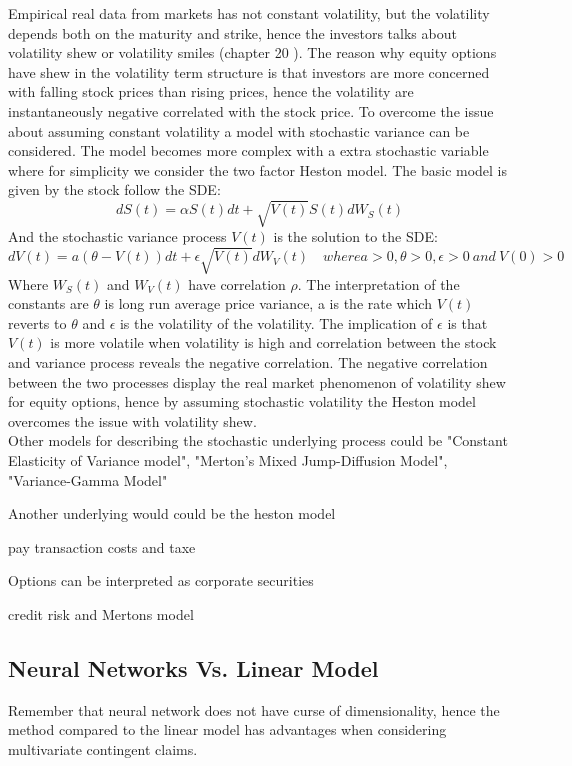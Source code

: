 Empirical real data from markets has not constant volatility, but the volatility depends both on the maturity and strike, hence the investors talks about volatility shew or volatility smiles (chapter 20 \parencite{Hull}). The reason why equity options have shew in the volatility term structure is that investors are more concerned with falling stock prices than rising prices, hence the volatility are instantaneously negative correlated with the stock price. To overcome the issue about assuming constant volatility a model with stochastic variance can be considered. The model becomes more complex with a extra stochastic variable where for simplicity we consider the two factor Heston model. The basic model is given by the stock follow the SDE:
$$dS(t)=\alpha S(t) dt + \sqrt{V(t)} S(t) dW_S(t)$$
And the stochastic variance process $V(t)$ is the solution to the SDE:
$$dV(t)=a(\theta - V(t))dt + \epsilon \sqrt{V(t)} dW_V(t) \quad where a>0,\theta>0, \epsilon>0 \ and \ V(0)>0$$
Where $W_S(t)$ and $W_V(t)$ have correlation $\rho$. The interpretation of the constants are $\theta$ is long run average price variance, a is the rate which $V(t)$ reverts to $\theta$ and $\epsilon$ is the volatility of the volatility. The implication of $\epsilon$ is that $V(t)$ is more volatile when volatility is high and correlation between the stock and variance process reveals the negative correlation. The negative correlation between the two processes display the real market phenomenon of volatility shew for equity options, hence by assuming stochastic volatility the Heston model overcomes the issue with volatility shew.\\

Other models for describing the stochastic underlying process could be "Constant Elasticity of Variance model", "Merton's Mixed Jump-Diffusion Model", "Variance-Gamma Model"

Another underlying would could be the heston model

pay transaction costs and taxe

Options can be interpreted as corporate securities

credit risk and Mertons model


\subsection{Neural Networks Vs. Linear Model}
Remember that neural network does not have curse of dimensionality, hence the method compared to the linear model has advantages when considering multivariate contingent claims.

